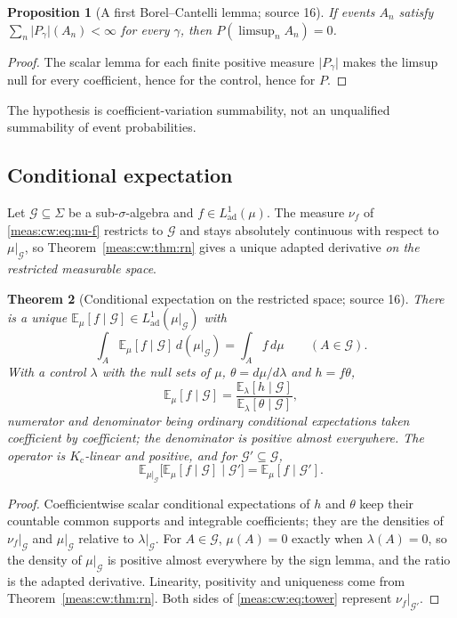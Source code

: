 \documentclass[11pt]{article}
\numberwithin{equation}{section}
\newtheorem{theorem}{Theorem}[section]
\newtheorem{proposition}[theorem]{Proposition}
\theoremstyle{definition}
\theoremstyle{remark}
\newcommand{\E}{\mathbb E}
\newcommand{\abs}[1]{\lvert#1\rvert}
\newcommand{\Kc}{K_{\mathrm c}}
\newcommand{\Lad}{L^1_{\mathrm{ad}}}
\begin{document}
\begin{proposition}[A first Borel--Cantelli lemma; source 16]
\label{meas:cw:prop:borel-cantelli}
If events $A_n$ satisfy $\sum_n\abs{P_\gamma}(A_n)<\infty$ for every $\gamma$, then
$P(\limsup_nA_n)=0$.
\end{proposition}
\begin{proof}
The scalar lemma for each finite positive measure $\abs{P_\gamma}$ makes the limsup
null for every coefficient, hence for the control, hence for $P$.
\end{proof}
The hypothesis is coefficient-variation summability, not an unqualified
summability of event probabilities.

\subsection{Conditional expectation}

Let $\mathcal G\subseteq\Sigma$ be a sub-$\sigma$-algebra and $f\in\Lad(\mu)$. The
measure $\nu_f$ of \eqref{meas:cw:eq:nu-f} restricts to $\mathcal G$ and stays
absolutely continuous with respect to $\mu|_{\mathcal G}$, so
Theorem~\ref{meas:cw:thm:rn} gives a unique adapted derivative \emph{on the
restricted measurable space}.

\begin{theorem}[Conditional expectation on the restricted space; source 16]
\label{meas:cw:thm:conditional}
There is a unique $\E_\mu[f\mid\mathcal G]\in\Lad(\mu|_{\mathcal G})$ with
\begin{equation}\label{meas:cw:eq:conditional}
 \int_A\E_\mu[f\mid\mathcal G]\,d(\mu|_{\mathcal G})=\int_Af\,d\mu\qquad(A\in\mathcal G).
\end{equation}
With a control $\lambda$ with the null sets of $\mu$, $\theta=d\mu/d\lambda$ and
$h=f\theta$,
\begin{equation}\label{meas:cw:eq:conditional-ratio}
 \E_\mu[f\mid\mathcal G]=\frac{\E_\lambda[h\mid\mathcal G]}{\E_\lambda[\theta\mid\mathcal G]},
\end{equation}
numerator and denominator being ordinary conditional expectations taken
coefficient by coefficient; the denominator is positive almost everywhere. The
operator is $\Kc$-linear and positive, and for $\mathcal G'\subseteq\mathcal G$,
\begin{equation}\label{meas:cw:eq:tower}
 \E_{\mu|_{\mathcal G}}\bigl[\E_\mu[f\mid\mathcal G]\mid\mathcal G'\bigr]=\E_\mu[f\mid\mathcal G'] .
\end{equation}
\end{theorem}
\begin{proof}
Coefficientwise scalar conditional expectations of $h$ and $\theta$ keep their
countable common supports and integrable coefficients; they are the densities of
$\nu_f|_{\mathcal G}$ and $\mu|_{\mathcal G}$ relative to $\lambda|_{\mathcal G}$. For
$A\in\mathcal G$, $\mu(A)=0$ exactly when $\lambda(A)=0$, so the density of
$\mu|_{\mathcal G}$ is positive almost everywhere by the sign lemma, and the ratio is
the adapted derivative. Linearity, positivity and uniqueness come from
Theorem~\ref{meas:cw:thm:rn}. Both sides of \eqref{meas:cw:eq:tower} represent
$\nu_f|_{\mathcal G'}$.
\end{proof}
\end{document}
